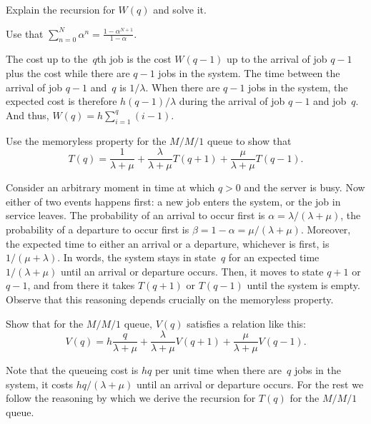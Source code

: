 \documentclass[queueing-book.tex]{subfiles}
\begin{document}
\begin{exercise}\label{ex:nmm-4}
Explain the  recursion for $W(q)$ and solve it.
\begin{hint}
Use that $\sum_{n=0}^N \alpha^n = \frac{1-\alpha^{N+1}}{1-\alpha}$.
\end{hint}
\begin{solution}
The cost up to the~$q$th job is the cost $W(q-1)$ up to the arrival of job $q-1$ plus the cost while there are $q-1$ jobs in the system.
The time between the arrival of job $q-1$ and~$q$ is $1/\lambda$.
When there are $q-1$ jobs in the system, the expected cost is therefore $h(q-1)/\lambda$ during the arrival of job $q-1$ and job~$q$.
And thus, $W(q) = h\sum_{i=1}^q (i-1)$.
\end{solution}
\end{exercise}

\begin{exercise}
Use the memoryless property for the $M/M/1$ queue to show that
\begin{equation}  \label{eq:92}
  T(q) =  \frac{1}{\lambda+\mu} + \frac{\lambda}{\lambda+\mu} T(q+1) + \frac{\mu}{\lambda+\mu} T(q-1).
\end{equation}
\begin{solution}
Consider an arbitrary moment in time at which $q>0$ and the server is busy.
Now either of two events happens first: a new job enters the system, or the job in service leaves.
The probability of an arrival to occur first is $\alpha=\lambda/(\lambda+\mu)$, the probability of a departure to occur first is $\beta=1-\alpha = \mu/(\lambda+\mu)$.
Moreover, the expected time to either an arrival or a departure, whichever is first, is $1/(\mu+\lambda)$.
In words, the system stays in state~$q$ for an expected time $1/(\lambda+\mu)$ until an arrival or departure occurs.
Then, it moves to state $q+1$ or $q-1$, and from there it takes $T(q+1)$ or $T(q-1)$ until the system is empty.
Observe that this reasoning depends crucially on the memoryless property.
\end{solution}
\end{exercise}

\begin{exercise}
Show that for the $M/M/1$ queue, $V(q)$ satisfies a relation like this:
\begin{equation}\label{eq:93}
  V(q) = h\frac{q}{\lambda + \mu} + \frac{\lambda}{\lambda+\mu} V(q+1) + \frac{\mu}{\lambda+\mu} V(q-1).
\end{equation}
\begin{solution}
Note that the queueing cost is $hq$ per unit time when there are~$q$ jobs in the system, it costs $hq/(\lambda+\mu)$ until an arrival or departure occurs. For the rest we follow the reasoning by which we derive the recursion for $T(q)$ for the $M/M/1$ queue.
\end{solution}
\end{exercise}
\end{document}
